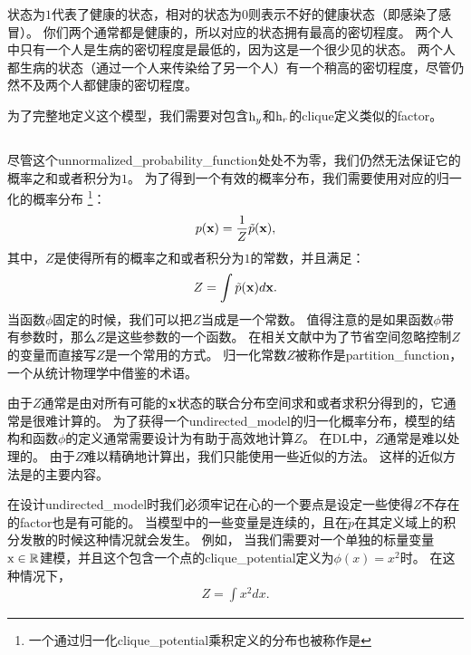 状态为$1$代表了健康的状态，相对的状态为$0$则表示不好的健康状态（即感染了感冒）。
你们两个通常都是健康的，所以对应的状态拥有最高的密切程度。
两个人中只有一个人是生病的密切程度是最低的，因为这是一个很少见的状态。
两个人都生病的状态（通过一个人来传染给了另一个人）有一个稍高的密切程度，尽管仍然不及两个人都健康的密切程度。


为了完整地定义这个模型，我们需要对包含$\mathrm{h}_y$和$\mathrm{h}_r$的\gls{clique}定义类似的\gls{factor}。


\subsection{}
\label{sec:the_partition_function}



尽管这个\gls{unnormalized_probability_function}处处不为零，我们仍然无法保证它的概率之和或者积分为$1$。
为了得到一个有效的概率分布，我们需要使用对应的归一化的概率分布
\footnote{一个通过归一化\gls{clique_potential}乘积定义的分布也被称作是}：
\begin{align}
p(\mathbf{x}) = \frac{1}{Z}\tilde{p}(\mathbf{x}),
\end{align}
其中，$Z$是使得所有的概率之和或者积分为$1$的常数，并且满足：
\begin{align}
Z = \int \tilde{p}(\mathbf{x})d\mathbf{x}.
\end{align}
当函数$\phi$固定的时候，我们可以把$Z$当成是一个常数。
值得注意的是如果函数$\phi$带有参数时，那么$Z$是这些参数的一个函数。
在相关文献中为了节省空间忽略控制$Z$的变量而直接写$Z$是一个常用的方式。
归一化常数$Z$被称作是\gls{partition_function}，一个从统计物理学中借鉴的术语。


由于$Z$通常是由对所有可能的$\mathbf{x}$状态的联合分布空间求和或者求积分得到的，它通常是很难计算的。
为了获得一个\gls{undirected_model}的归一化概率分布，模型的结构和函数$\phi$的定义通常需要设计为有助于高效地计算$Z$。
在\gls{DL}中，$Z$通常是难以处理的。
由于$Z$难以精确地计算出，我们只能使用一些近似的方法。
这样的近似方法是的主要内容。



在设计\gls{undirected_model}时我们必须牢记在心的一个要点是设定一些使得$Z$不存在的\gls{factor}也是有可能的。
当模型中的一些变量是连续的，且在$\tilde{p}$在其定义域上的积分发散的时候这种情况就会发生。
例如， 当我们需要对一个单独的标量变量$\mathrm{x}\in\mathbb{R}$建模，并且这个包含一个点的\gls{clique_potential}定义为$\phi(x) = x^2$时。
在这种情况下，
\begin{align}
Z = \int x^2 dx.
\end{align}

